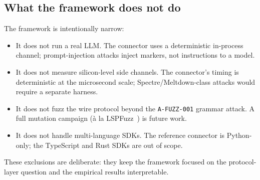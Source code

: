 \subsection{What the framework does not do}

The framework is intentionally narrow:

\begin{itemize}
  \item It does not run a real LLM. The connector uses a
        deterministic in-process channel; prompt-injection
        attacks inject markers, not instructions to a model.
  \item It does not measure silicon-level side channels. The
        connector's timing is deterministic at the
        microsecond scale; Spectre/Meltdown-class attacks
        would require a separate harness.
  \item It does not fuzz the wire protocol beyond the
        \texttt{A-FUZZ-001} grammar attack. A full mutation
        campaign (à la LSPFuzz~\cite{zhu_2025_lspfuzz}) is
        future work.
  \item It does not handle multi-language SDKs. The reference
        connector is Python-only; the TypeScript and Rust
        SDKs are out of scope.
\end{itemize}

These exclusions are deliberate: they keep the framework
focused on the protocol-layer question and the empirical
results interpretable.